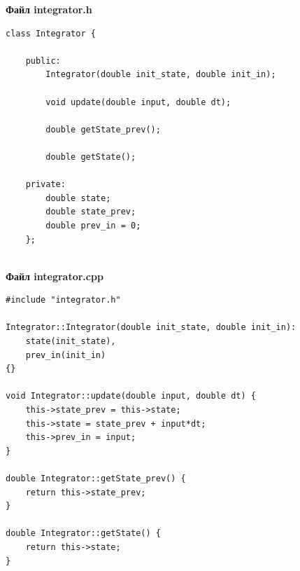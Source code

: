 \documentclass[14pt,a4paper]{extreport}
\begin{document}
\textbf{Файл integrator.h}
\begin{alltt}
\begin{verbatim}
class Integrator {

    public:
        Integrator(double init_state, double init_in);
    
        void update(double input, double dt);
    
        double getState_prev();
    
        double getState();
    
    private:
        double state;
        double state_prev;
        double prev_in = 0;
    };
        
\end{verbatim}
\end{alltt}

\textbf{Файл integrator.cpp}
\begin{alltt}
\begin{verbatim}
#include "integrator.h"

Integrator::Integrator(double init_state, double init_in): 
    state(init_state),
    prev_in(init_in)
{}

void Integrator::update(double input, double dt) {
    this->state_prev = this->state;
    this->state = state_prev + input*dt;
    this->prev_in = input;
}

double Integrator::getState_prev() {
    return this->state_prev;
}

double Integrator::getState() {
    return this->state;
}
\end{verbatim}
\end{alltt}
\end{document}
